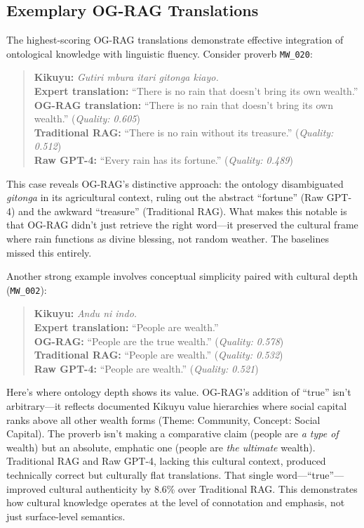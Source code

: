 \subsection{Exemplary OG-RAG Translations}
\label{subsec:exemplary_translations}

The highest-scoring OG-RAG translations demonstrate effective integration of ontological knowledge with linguistic fluency. Consider proverb \texttt{MW\_020}:

\begin{quote}
\textbf{Kikuyu:} \emph{Gutiri mbura itari gitonga kiayo.}\\
\textbf{Expert translation:} ``There is no rain that doesn't bring its own wealth.''\\
\textbf{OG-RAG translation:} ``There is no rain that doesn't bring its own wealth.'' (\textit{Quality: 0.605})\\
\textbf{Traditional RAG:} ``There is no rain without its treasure.'' (\textit{Quality: 0.512})\\
\textbf{Raw GPT-4:} ``Every rain has its fortune.'' (\textit{Quality: 0.489})
\end{quote}

This case reveals OG-RAG's distinctive approach: the ontology disambiguated \emph{gitonga} in its agricultural context, ruling out the abstract ``fortune'' (Raw GPT-4) and the awkward ``treasure'' (Traditional RAG). What makes this notable is that OG-RAG didn't just retrieve the right word—it preserved the cultural frame where rain functions as divine blessing, not random weather. The baselines missed this entirely.

Another strong example involves conceptual simplicity paired with cultural depth (\texttt{MW\_002}):

\begin{quote}
\textbf{Kikuyu:} \emph{Andu ni indo.}\\
\textbf{Expert translation:} ``People are wealth.''\\
\textbf{OG-RAG:} ``People are the true wealth.'' (\textit{Quality: 0.578})\\
\textbf{Traditional RAG:} ``People are wealth.'' (\textit{Quality: 0.532})\\
\textbf{Raw GPT-4:} ``People are wealth.'' (\textit{Quality: 0.521})
\end{quote}

Here's where ontology depth shows its value. OG-RAG's addition of ``true'' isn't arbitrary—it reflects documented Kikuyu value hierarchies where social capital ranks above all other wealth forms (Theme: Community, Concept: Social Capital). The proverb isn't making a comparative claim (people are \emph{a type of} wealth) but an absolute, emphatic one (people are \emph{the ultimate} wealth). Traditional RAG and Raw GPT-4, lacking this cultural context, produced technically correct but culturally flat translations. That single word—``true''—improved cultural authenticity by 8.6\% over Traditional RAG. This demonstrates how cultural knowledge operates at the level of connotation and emphasis, not just surface-level semantics.

